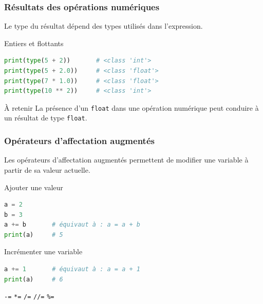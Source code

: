 \documentclass[10pt]{beamer}
\begin{document}
\begin{frame}[containsverbatim]
\frametitle{Résultats des opérations numériques}

Le type du résultat dépend des types utilisés dans l'expression.

\begin{exampleblock}{Entiers et flottants}
\begin{lstlisting}[language=Python]
print(type(5 + 2))       # <class 'int'>
print(type(5 + 2.0))     # <class 'float'>
print(type(7 * 1.0))     # <class 'float'>
print(type(10 ** 2))     # <class 'int'>
\end{lstlisting}
\end{exampleblock}

\vspace{0.15cm}

\begin{alertblock}{À retenir}
La présence d'un \texttt{float} dans une opération numérique
peut conduire à un résultat de type \texttt{float}.
\end{alertblock}
\end{frame}
\begin{frame}[containsverbatim]
\frametitle{Opérateurs d'affectation augmentés}

Les opérateurs d'affectation augmentés permettent de modifier
une variable à partir de sa valeur actuelle.

\begin{exampleblock}{Ajouter une valeur}
\begin{lstlisting}[language=Python]
a = 2
b = 3
a += b       # équivaut à : a = a + b
print(a)     # 5
\end{lstlisting}
\end{exampleblock}

\vspace{0.2cm}

\begin{exampleblock}{Incrémenter une variable}
\begin{lstlisting}[language=Python]
a += 1       # équivaut à : a = a + 1
print(a)     # 6
\end{lstlisting}
\end{exampleblock}

\begin{center}
\texttt{-=} \qquad \texttt{*=} \qquad \texttt{/=} \qquad \texttt{//=} \qquad \texttt{\%=}
\end{center}

\end{frame}
\end{document}
